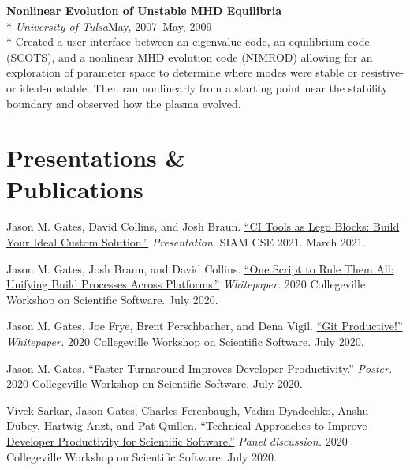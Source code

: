 \documentclass[margin,line,pifont,palatino,10pt]{res}
\begin{document}
\begin{resume}
{\bf Nonlinear Evolution of Unstable MHD Equilibria}\\*
{\it University of Tulsa}\hfill May, 2007--May, 2009\\*
Created a user interface between an eigenvalue code, an equilibrium code (SCOTS), and a nonlinear MHD evolution code (NIMROD) allowing for an exploration of parameter space to determine where modes were stable or resistive- or ideal-unstable.  Then ran nonlinearly from a starting point near the stability boundary and observed how the plasma evolved.






\vspace{1.5mm}
\section{\sc Presentations \&\\Publications}
\setcounter{cnt}{1}
\begin{list}{[] }{\leftmargin=0.255in}
\item
Jason M. Gates, David Collins, and Josh Braun.  \href{https://figshare.com/articles/presentation/CI_Tools_as_Lego_Blocks_Build_Your_Ideal_Custom_Solution/14180096}{``CI Tools as Lego Blocks:  Build Your Ideal Custom Solution.''}  \emph{Presentation.}  SIAM CSE 2021.  March 2021.
\item
Jason M. Gates, Josh Braun, and David Collins.  \href{https://cfwebprod.sandia.gov/cfdocs/CompResearch/docs/gates-unifying-build-processes-2.pdf}{``One Script to Rule Them All:  Unifying Build Processes Across Platforms.''}  \emph{Whitepaper.}  2020 Collegeville Workshop on Scientific Software.  July 2020.
\item
Jason M. Gates, Joe Frye, Brent Perschbacher, and Dena Vigil.  \href{https://cfwebprod.sandia.gov/cfdocs/CompResearch/docs/gates-git-productive1.pdf}{``Git Productive!''}  \emph{Whitepaper.}  2020 Collegeville Workshop on Scientific Software.  July 2020.
\item
Jason M. Gates.  \href{https://cfwebprod.sandia.gov/cfdocs/CompResearch/docs/gates-turnaround-improvements-poster.pdf}{``Faster Turnaround Improves Developer Productivity.''}  \emph{Poster.}  2020 Collegeville Workshop on Scientific Software.  July 2020.
\item
Vivek Sarkar, Jason Gates, Charles Ferenbaugh, Vadim Dyadechko, Anshu Dubey, Hartwig Anzt, and Pat Quillen.  \href{https://www.youtube.com/watch?v=zMmtUgEExZ8}{``Technical Approaches to Improve Developer Productivity for Scientific Software.''}  \emph{Panel discussion.}  2020 Collegeville Workshop on Scientific Software.  July 2020.

\end{list}
\end{resume}
\end{document}
